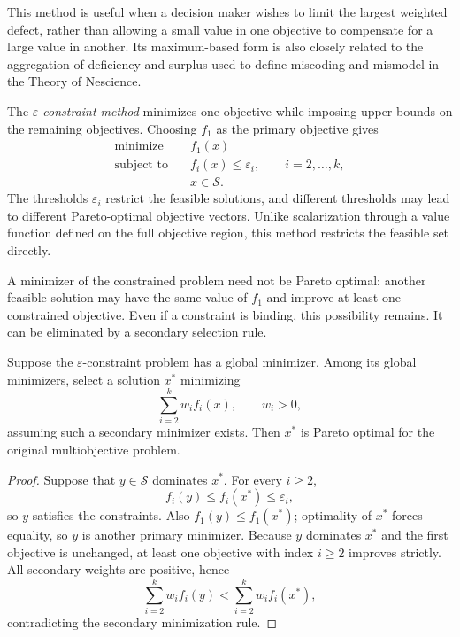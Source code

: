 This method is useful when a decision maker wishes to limit the largest weighted defect, rather than allowing a small value in one objective to compensate for a large value in another. Its maximum-based form is also closely related to the aggregation of deficiency and surplus used to define miscoding and mismodel in the Theory of Nescience.

The \emph{$\varepsilon$-constraint method} minimizes one objective while imposing upper bounds on the remaining objectives. Choosing $f_1$ as the primary objective gives
\[
\begin{aligned}
\text{minimize}\quad & f_1(x)\\
\text{subject to}\quad & f_i(x)\leq\varepsilon_i,
\qquad i=2,\ldots,k,\\
& x\in\mathcal{S}.
\end{aligned}
\]
The thresholds $\varepsilon_i$ restrict the feasible solutions, and different thresholds may lead to different Pareto-optimal objective vectors. Unlike scalarization through a value function defined on the full objective region, this method restricts the feasible set directly.

A minimizer of the constrained problem need not be Pareto optimal: another feasible solution may have the same value of $f_1$ and improve at least one constrained objective. Even if a constraint is binding, this possibility remains. It can be eliminated by a secondary selection rule.

\begin{proposition}
\label{prop:epsilon_constraint_pareto_optimal}
Suppose the $\varepsilon$-constraint problem has a global minimizer. Among its global minimizers, select a solution $x^*$ minimizing
\[
\sum_{i=2}^{k}w_i f_i(x),\qquad w_i>0,
\]
assuming such a secondary minimizer exists. Then $x^*$ is Pareto optimal for the original multiobjective problem.
\end{proposition}
\begin{proof}
Suppose that $y\in\mathcal{S}$ dominates $x^*$. For every $i\geq2$,
\[
f_i(y)\leq f_i(x^*)\leq\varepsilon_i,
\]
so $y$ satisfies the constraints. Also $f_1(y)\leq f_1(x^*)$; optimality of $x^*$ forces equality, so $y$ is another primary minimizer. Because $y$ dominates $x^*$ and the first objective is unchanged, at least one objective with index $i\geq2$ improves strictly. All secondary weights are positive, hence
\[
\sum_{i=2}^{k}w_i f_i(y)<\sum_{i=2}^{k}w_i f_i(x^*),
\]
contradicting the secondary minimization rule.
\end{proof}

